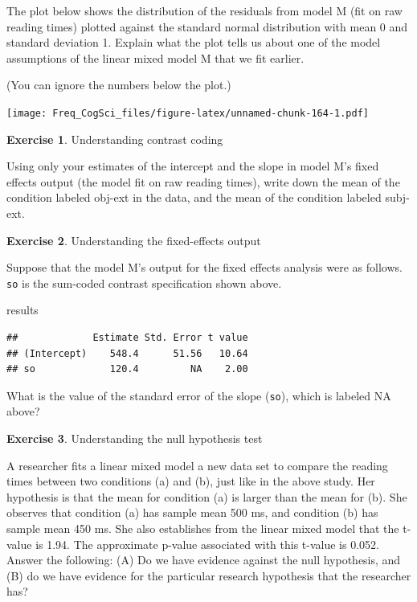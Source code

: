 \documentclass[
  12pt,
]{krantz}
\newenvironment{Shaded}{\begin{snugshade}}{\end{snugshade}}
\newcommand{\NormalTok}[1]{#1}
\theoremstyle{definition}
\theoremstyle{definition}
\theoremstyle{definition}
\newtheorem{exercise}{Exercise}[chapter]
\theoremstyle{definition}
\theoremstyle{remark}
\begin{document}
The plot below shows the distribution of the residuals from model M (fit on raw reading times) plotted against the standard normal distribution with mean 0 and standard deviation 1. Explain what the plot tells us about one of the model assumptions of the linear mixed model M that we fit earlier.

(You can ignore the numbers below the plot.)

\texttt{[image: Freq\_CogSci\_files/figure-latex/unnamed-chunk-164-1.pdf]}

\begin{exercise}
\protect\hypertarget{exr:LMMGibsonWuContrastCoding}{}\label{exr:LMMGibsonWuContrastCoding}Understanding contrast coding
\end{exercise}

Using only your estimates of the intercept and the slope in model M's fixed effects output (the model fit on raw reading times), write down the mean of the condition labeled obj-ext in the data, and the mean of the condition labeled subj-ext.

\begin{exercise}
\protect\hypertarget{exr:LMMGibsonWuFE}{}\label{exr:LMMGibsonWuFE}Understanding the fixed-effects output
\end{exercise}

Suppose that the model M's output for the fixed effects analysis were as follows. \texttt{so} is the sum-coded contrast specification shown above.

\begin{Shaded}
\begin{Highlighting}[]
\NormalTok{results}
\end{Highlighting}
\end{Shaded}

\begin{verbatim}
##             Estimate Std. Error t value
## (Intercept)    548.4      51.56   10.64
## so             120.4         NA    2.00
\end{verbatim}

What is the value of the standard error of the slope (\texttt{so}), which is labeled NA above?

\begin{exercise}
\protect\hypertarget{exr:LMMGibsonWuNHST}{}\label{exr:LMMGibsonWuNHST}Understanding the null hypothesis test
\end{exercise}

A researcher fits a linear mixed model a new data set to compare the reading times between two conditions (a) and (b), just like in the above study. Her hypothesis is that the mean for condition (a) is larger than the mean for (b). She observes that condition (a) has sample mean 500 ms, and condition (b) has sample mean 450 ms. She also establishes from the linear mixed model that the t-value is 1.94. The approximate p-value associated with this t-value is 0.052. Answer the following: (A) Do we have evidence against the null hypothesis, and (B) do we have evidence for the particular research hypothesis that the researcher has?
\end{document}
